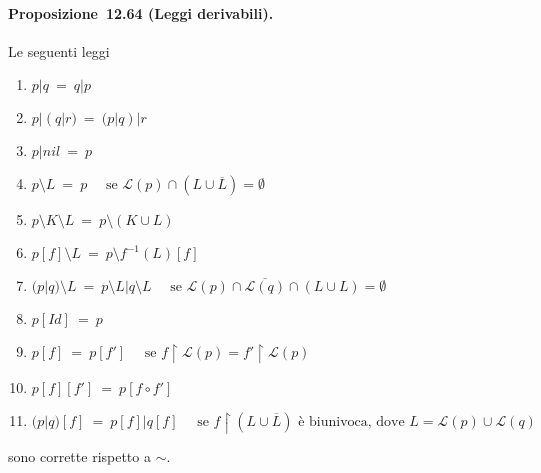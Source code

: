 \documentclass[a4paper,twosides]{report}
\begin{document}
\paragraph{Proposizione~12.64 (Leggi derivabili).} Le seguenti leggi
\begin{enumerate}
\item $p|q\ =\ q|p$
\item $p|(q|r)\ =\ (p|q)|r$
\item $p|nil\ =\ p$
\item $p \setminus L \ =\  p\quad\text{ se }\mathcal{L}(p) \cap (L \cup \overline{L}) = \emptyset$
\item $p \setminus K \setminus L \ =\  p \setminus (K \cup L)$
\item $p[f] \setminus L \ =\  p \setminus f^{-1} (L)[f]$
\item $(p|q) \setminus L \ =\  p \setminus L|q \setminus L\quad\text{ se }\mathcal{L}(p) \cap \overline{\mathcal{L}(q)} \cap (L \cup L) = \emptyset$
\item $p[Id] \ =\  p$
\item $p[f] \ =\  p[f']\quad\text{ se }f \upharpoonright \mathcal{L}(p) = f'\upharpoonright \mathcal{L}(p)$
\item $p[f][f'] \ =\  p[f \circ f']$
\item $(p|q)[f] \ =\  p[f]|q[f]\quad\text{ se }f \upharpoonright (L \cup \overline{L})\text{ è biunivoca, dove }L = \mathcal{L}(p) \cup \mathcal{L}(q)$
\end{enumerate}
sono corrette rispetto a $\sim$.
\end{document}
